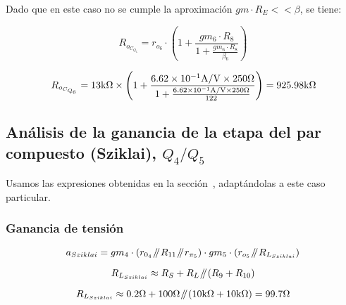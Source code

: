 Dado que en este caso no se cumple la aproximación $gm \cdot R_{E} << \beta$, se tiene:


\begin{equation}
R_{o_{C_{Q_{6}}}} = r_{o_{6}} \cdot \left( 1 + \frac{  gm_{6} \cdot R_{8}  }{  1 + \frac{ gm_{6} \cdot R_{8}  }{ \beta_{6} }   }     \right)
\end{equation}


\begin{equation*}
R_{o_{C_{Q_{6}}}} = 13 \si[per-mode=symbol]{\kilo\ohm} \times \left( 1 + \frac{  \num{6.62E-1} \si[per-mode=symbol]{\ampere\per\volt} \times 250 \si[per-mode=symbol]{\ohm}  }{  1 + \frac{  \num{6.62E-1} \si[per-mode=symbol]{\ampere\per\volt} \times 250 \si[per-mode=symbol]{\ohm}  }{ 122 }   }     \right) = 925.98 \si[per-mode=symbol]{\kilo\ohm}
\end{equation*}



\subsection{Análisis de la ganancia de la etapa del par compuesto (Sziklai), $Q_{4}/Q_{5}$}

Usamos las expresiones obtenidas en la sección~, adaptándolas a este caso particular.


\subsubsection{Ganancia de tensión}

\begin{equation}
a_{Sziklai} = gm_{4} \cdot \left( r_{0_{4}} \parallelresistors R_{11} \parallelresistors r_{\pi_{5}} \right) \cdot gm_{5} \cdot \left( r_{o_{5}} \parallelresistors R_{L_{Sziklai}} \right)
\end{equation}

\begin{equation}
R_{L_{Sziklai}} \approx R_{S} + R_{L} \parallelresistors \left( R_{9} + R_{10} \right)
\end{equation}

\begin{equation*}
R_{L_{Sziklai}} \approx 0.2 \si[per-mode=symbol]{\ohm} + 100 \si[per-mode=symbol]{\ohm} \parallelresistors \left( 10 \si[per-mode=symbol]{\kilo\ohm} + 10 \si[per-mode=symbol]{\kilo\ohm} \right) = 99.7 \si[per-mode=symbol]{\ohm}
\end{equation*}


